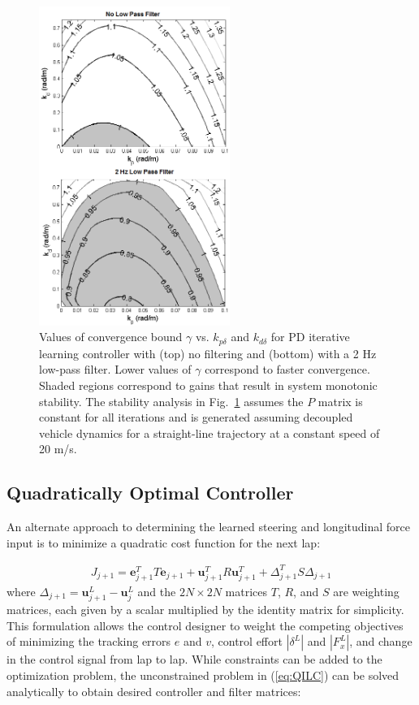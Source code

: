 \documentclass[9pt,shortpaper,twoside,web]{ieeecolor}
\begin{document}
{{{\begin{figure}[tb]
\centering
\includegraphics[width=2.45in]{figures/monotonicStability.png}
\caption[Values of convergence bound $\gamma$ vs. $k_{p\delta}$ and $k_{d\delta}$ for PD iterative learning controller]{Values of convergence bound $\gamma$ vs. $k_{p\delta}$ and $k_{d\delta}$ for PD iterative learning controller with (top) no filtering and (bottom) with a 2 Hz low-pass filter. Lower values of $\gamma$ correspond to faster convergence.
Shaded regions correspond to gains that result in system monotonic stability. The stability analysis in Fig.~\ref{fig:stabPlot} assumes the $P$ matrix is constant for all iterations and is generated assuming decoupled vehicle dynamics
 for a straight-line trajectory at a constant speed of 20 m/s.}
\label{fig:stabPlot}
\end{figure}


\subsection{Quadratically Optimal Controller}\label{sec:controller}
\label{sec:qopt}
An alternate approach to determining the learned steering and longitudinal force input is to minimize a quadratic cost function for the next lap:

\begin{align}
J_{j\!+\!1} = \textbf{e}_{j\!+\!1}^TT\textbf{e}_{j\!+\!1} + \textbf{u}^T_{j\!+\!1} R \textbf{u}^T_{j\!+\!1}+\Delta_{j\!+\!1}^TS\Delta_{j\!+\!1}
\label{eq:QILC}
\end{align}
where $\Delta_{j\!+\!1} = \mathbf{u}^L_{j\!+\!1} - \mathbf{u}^L_j$ and the $2N \times 2N$ matrices $T$, $R$, and $S$ are weighting matrices, each given
by a scalar multiplied by the identity matrix for simplicity.
This formulation allows the control designer to weight the competing objectives of minimizing the tracking errors $e$ and $v$, control effort $|\delta^L|$ and $|F^L_x|$, and change in the control signal from lap to lap.
While constraints can be added to the optimization problem, the unconstrained problem in (\ref{eq:QILC}) can be solved analytically \cite{bristow2008} to obtain desired controller and filter matrices:

}}}
\end{document}

